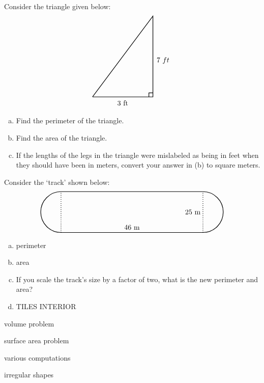 \documentclass[11pt,letterpaper]{article}
\begin{document}

 Consider the triangle given below:
	\[
	\begin{tikzpicture}
	\draw[line width=0.03cm] (0,0) -- (3,0) -- (3,4) -- (0,0);
	\draw[line width=0.03cm] (2.8,0) -- (2.8,0.2) -- (3,0.2);
	\node at (1.5,-0.3) {3~ft};
	\node at (3.5,1.8) {$7~ft$};
	\end{tikzpicture}
	\]

\begin{enumerate}[(a)]
\item Find the perimeter of the triangle.
\item Find the area of the triangle. 
\item If the lengths of the legs in the triangle were mislabeled as being in feet when they should have been in meters, convert your answer in (b) to square meters. 
\end{enumerate}



\newpage



 Consider the `track' shown below:
	\[
	\begin{tikzpicture}
	\draw[line width=0.03cm] (0,0) -- (7,0);
	\draw[line width=0.03cm] (0,2) -- (7,2);
	
	\draw[line width=0.03cm,dotted] (0,0) -- (0,2);
	\draw[line width=0.03cm,dotted] (7,0) -- (7,2);
	 
	\draw[line width=0.03cm] (0,2) arc(90:270:1);
	\draw[line width=0.03cm] (7,0) arc(270:450:1);
	
	\node at (3.5,0.25) {46~m};
	\node at (6.5,1) {25~m};
	\end{tikzpicture}
	\]

\begin{enumerate}[(a)]
\item perimeter
\item area
\item If you scale the track's size by a factor of two, what is the new perimeter and area?
\item TILES INTERIOR
\end{enumerate}



\newpage



 volume problem


 surface area problem


 various computations 


 irregular shapes
\end{document}
